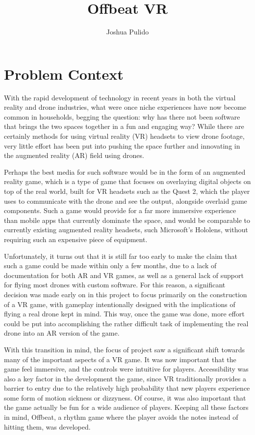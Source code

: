 \documentclass[10pt,twocolumn]{article}
\title{Offbeat VR}
\author{Joshua Pulido}
\affiliation{Occidental College}
\begin{document}
\maketitle

\section{Problem Context}
With the rapid development of technology in recent years in both the virtual reality and drone industries, what were once niche experiences have now become common in households, begging the question: why has there not been software that brings the two spaces together in a fun and engaging way? While there are certainly methods for using virtual reality (VR) headsets to view drone footage, very little effort has been put into pushing the space further and innovating in the augmented reality (AR) field using drones. 

Perhaps the best media for such software would be in the form of an augmented reality game, which is a type of game that focuses on overlaying digital objects on top of the real world, built for VR headsets such as the Quest 2, which the player uses to communicate with the drone and see the output, alongside overlaid game components. Such a game would provide for a far more immersive experience than mobile apps that currently dominate the space, and would be comparable to currently existing augmented reality headsets, such Microsoft's Hololens, without requiring such an expensive piece of equipment. 

Unfortunately, it turns out that it is still far too early to make the claim that such a game could be made within only a few months, due to a lack of documentation for both AR and VR games, as well as a general lack of support for flying most drones with custom software. For this reason, a significant decision was made early on in this project to focus primarily on the construction of a VR game, with gameplay intentionally designed with the implications of flying a real drone kept in mind. This way, once the game was done, more effort could be put into accomplishing the rather difficult task of implementing the real drone into an AR version of the game.

With this transition in mind, the focus of project saw a significant shift towards many of the important aspects of a VR game. It was now important that the game feel immersive, and the controls were intuitive for players. Accessibility was also a key factor in the development the game, since VR traditionally provides a barrier to entry due to the relatively high probability that new players experience some form of motion sickness or dizzyness. Of course, it was also important that the game actually be fun for a wide audience of players. Keeping all these factors in mind, Offbeat, a rhythm game where the player avoids the notes instead of hitting them, was developed.
\end{document}
